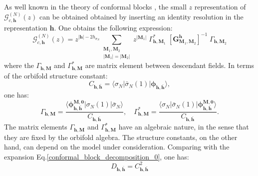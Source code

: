 \documentclass[a4paper,11pt]{article}
\begin{document}
\noindent As well known in the theory of conformal blocks \cite{DiFrancesco}, the small $z$ representation of $\mathcal{G}_{c, \boldsymbol{h}}^{(N)}(z)$ can be obtained obtained by inserting an identity resolution
in the representation $\boldsymbol{h}$. One obtains the following expression: 
\begin{equation}\label{conformal_block_decomposition}
 \mathcal{G}_{c,\boldsymbol{h}}^{(N)}(z)=
 z^{|\boldsymbol{h}|-2h_{\sigma_N}}\sum_{\substack{\boldsymbol{M}_1, \boldsymbol{M}_2 \\ |\boldsymbol{M}_1|=|\boldsymbol{M}_2|} } z^{|\boldsymbol{M}_1|}\;\Gamma^{*}_{\boldsymbol{h}, \boldsymbol{M}_1}\; [\boldsymbol{G}^{\boldsymbol{h}}_{\boldsymbol{M}_1,\boldsymbol{M}_2}]^{-1}\;\Gamma_{\boldsymbol{h},\boldsymbol{M}_2}
\end{equation}
where the $\Gamma_{\boldsymbol{h},\boldsymbol{M}}$ and $\Gamma^{*}_{\boldsymbol{h},\boldsymbol{M}}$ are matrix element between descendant fields.  In terms of the orbifold structure constant:
\begin{equation}
C_{\boldsymbol{h},\boldsymbol{\bar{h}}}=\langle  \sigma_{N}|\bar{\sigma}_{N}(1)|\boldsymbol{\phi}_{\boldsymbol{h},\boldsymbol{\bar{h}}}\rangle,
\end{equation}
one has: 
 \begin{equation}
\Gamma_{\boldsymbol{h},\boldsymbol{M}} = \frac{\langle \boldsymbol{\phi}^{\boldsymbol{M},\boldsymbol{0}}_{\boldsymbol{h},\boldsymbol{\bar{h}}}| \sigma_{N}(1)|\bar{\sigma}_{N}\rangle}{C_{\boldsymbol{h},\boldsymbol{\bar{h}}}},\quad  \Gamma^{*}_{\boldsymbol{h},\boldsymbol{M}} = \frac{\langle  \sigma_{N}|\bar{\sigma}_{N}(1)|\boldsymbol{\phi}^{\boldsymbol{M},\boldsymbol{0}}_{\boldsymbol{h},\boldsymbol{\bar{h}}}\rangle}{C_{\boldsymbol{h},\boldsymbol{\bar{h}}}} .
 \end{equation}
 The matrix elements  $\Gamma_{\boldsymbol{h},\boldsymbol{M}}$ and $\Gamma^{*}_{\boldsymbol{h},\boldsymbol{M}}$ have an algebraic nature, in the sense that they are fixed by the orbifold algebra. The structure constants, on the other hand, can depend on the model under consideration. Comparing with the expansion Eq.\eqref{conformal_block_decomposition_0}, one has:
 \begin{equation}
 D_{\boldsymbol{h},\boldsymbol{\bar{h}}}= C_{\boldsymbol{h},\boldsymbol{\bar{h}}}^2
 \end{equation}
\end{document}

